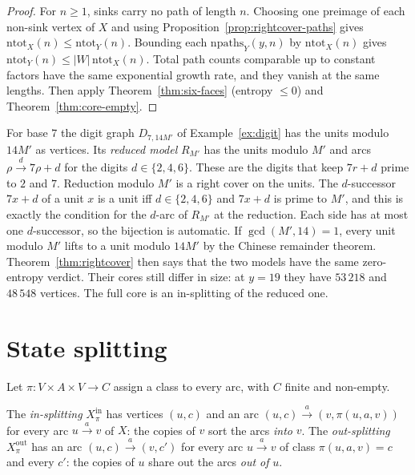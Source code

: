 \begin{proof}
For \(n\ge1\), sinks carry no path of length \(n\). Choosing one preimage of each non-sink vertex
of \(X\) and using Proposition~\ref{prop:rightcover-paths} gives
\(\mathrm{ntot}_X(n)\le\mathrm{ntot}_Y(n)\). Bounding each \(\mathrm{npaths}_Y(y,n)\) by
\(\mathrm{ntot}_X(n)\) gives \(\mathrm{ntot}_Y(n)\le|W|\,\mathrm{ntot}_X(n)\). Total path counts
comparable up to constant factors have the same exponential growth rate, and they vanish at
the same lengths. Then apply Theorem~\ref{thm:six-faces} (entropy \(\le0\)) and
Theorem~\ref{thm:core-empty}.
\end{proof}

\begin{example}\label{ex:full-reduced}
For base \(7\) the digit graph \(D_{7,14M'}\) of Example~\ref{ex:digit} has the units modulo
\(14M'\) as vertices. Its \emph{reduced model} \(R_{M'}\) has the units modulo \(M'\) and arcs
\(\rho\xrightarrow{d}7\rho+d\) for the digits \(d\in\{2,4,6\}\). These are the digits that keep
\(7r+d\) prime to \(2\) and \(7\). Reduction modulo \(M'\) is a right cover on the units. The
\(d\)-successor \(7x+d\) of a unit \(x\) is a unit iff \(d\in\{2,4,6\}\) and \(7x+d\) is prime to
\(M'\), and this is exactly the condition for the \(d\)-arc of \(R_{M'}\) at the reduction. Each
side has at most one \(d\)-successor, so the bijection is automatic. If \(\gcd(M',14)=1\), every
unit modulo \(M'\) lifts to a unit modulo \(14M'\) by the Chinese remainder theorem. Theorem~\ref{thm:rightcover}
then says that the two models have the same zero-entropy verdict. Their cores still differ in
size: at \(y=19\) they have \(53\,218\) and \(48\,548\) vertices. The full core is an in-splitting
of the reduced one.
\end{example}

\section{State splitting}

Let \(\pi\colon V\times A\times V\to C\) assign a class to every arc, with \(C\) finite and
non-empty.

\begin{definition}\label{def:split}
The \emph{in-splitting} \(X_\pi^{\mathrm{in}}\) \cite[Def.~2.4.7]{LM95} has vertices \((u,c)\)
and an arc \((u,c)\xrightarrow{a}(v,\pi(u,a,v))\) for every arc \(u\xrightarrow{a}v\) of \(X\):
the copies of \(v\) sort the arcs \emph{into} \(v\). The \emph{out-splitting}
\(X_\pi^{\mathrm{out}}\) \cite[Def.~2.4.3]{LM95} has an arc \((u,c)\xrightarrow{a}(v,c')\) for
every arc \(u\xrightarrow{a}v\) of class \(\pi(u,a,v)=c\) and every \(c'\): the copies of \(u\)
share out the arcs \emph{out of} \(u\).
\end{definition}

